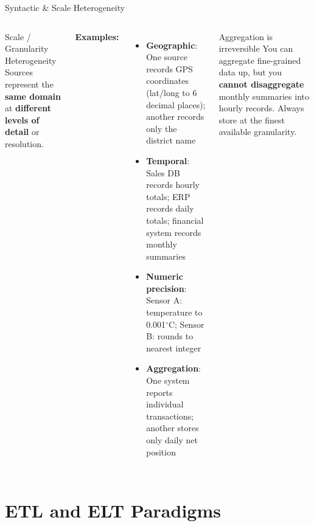 \documentclass[aspectratio=169,10pt]{beamer}
\begin{document}
\begin{frame}{Syntactic \& Scale Heterogeneity}
\begin{columns}[T]
      \begin{block}{Scale / Granularity Heterogeneity}
        Sources represent the \textbf{same domain} at \textbf{different levels of detail} or resolution.
      \end{block}
      \vspace{4pt}
      \textbf{Examples:}
      \begin{itemize}
        \item \textbf{Geographic}: One source records GPS coordinates (lat/long to 6 decimal places); another records only the district name
        \item \textbf{Temporal}: Sales DB records hourly totals; ERP records daily totals; financial system records monthly summaries
        \item \textbf{Numeric precision}: Sensor A: temperature to 0.001$^\circ$C; Sensor B: rounds to nearest integer
        \item \textbf{Aggregation}: One system reports individual transactions; another stores only daily net position
      \end{itemize}
      \vspace{4pt}
      \begin{alertblock}{Aggregation is irreversible}
        You can aggregate fine-grained data up, but you \textbf{cannot disaggregate} monthly summaries into hourly records.  Always store at the finest available granularity.
      \end{alertblock}
  \end{columns}
\end{frame}

\section{ETL and ELT Paradigms}
\end{document}
